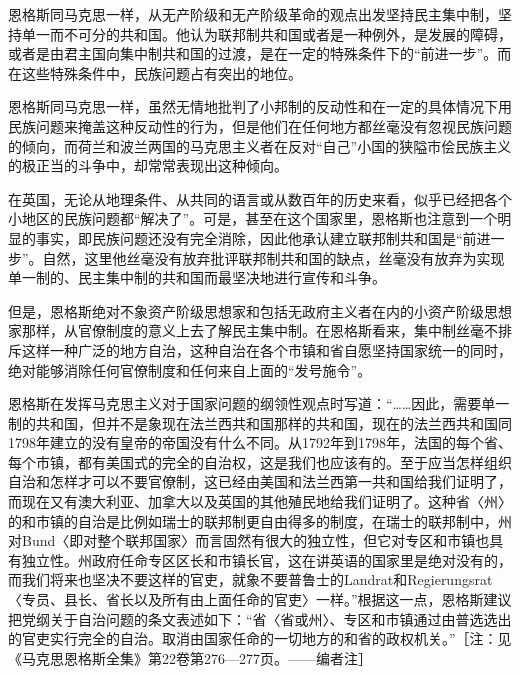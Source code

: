 \documentclass[UTF8, 12pt, a4paper]{ctexrep}
\begin{document}
恩格斯同马克思一样，从无产阶级和无产阶级革命的观点出发坚持民主集中制，坚持单一而不可分的共和国。他认为联邦制共和国或者是一种例外，是发展的障碍，或者是由君主国向集中制共和国的过渡，是在一定的特殊条件下的“前进一步”。而在这些特殊条件中，民族问题占有突出的地位。

恩格斯同马克思一样，虽然无情地批判了小邦制的反动性和在一定的具体情况下用民族问题来掩盖这种反动性的行为，但是他们在任何地方都丝毫没有忽视民族问题的倾向，而荷兰和波兰两国的马克思主义者在反对“自己”小国的狭隘市侩民族主义的极正当的斗争中，却常常表现出这种倾向。

在英国，无论从地理条件、从共同的语言或从数百年的历史来看，似乎已经把各个小地区的民族问题都“解决了”。可是，甚至在这个国家里，恩格斯也注意到一个明显的事实，即民族问题还没有完全消除，因此他承认建立联邦制共和国是“前进一步”。自然，这里他丝毫没有放弃批评联邦制共和国的缺点，丝毫没有放弃为实现单一制的、民主集中制的共和国而最坚决地进行宣传和斗争。

但是，恩格斯绝对不象资产阶级思想家和包括无政府主义者在内的小资产阶级思想家那样，从官僚制度的意义上去了解民主集中制。在恩格斯看来，集中制丝毫不排斥这样一种广泛的地方自治，这种自治在各个市镇和省自愿坚持国家统一的同时，绝对能够消除任何官僚制度和任何来自上面的“发号施令”。

恩格斯在发挥马克思主义对于国家问题的纲领性观点时写道：“……因此，需要单一制的共和国，但并不是象现在法兰西共和国那样的共和国，现在的法兰西共和国同1798年建立的没有皇帝的帝国没有什么不同。从1792年到1798年，法国的每个省、每个市镇，都有美国式的完全的自治权，这是我们也应该有的。至于应当怎样组织自治和怎样才可以不要官僚制，这已经由美国和法兰西第一共和国给我们证明了，而现在又有澳大利亚、加拿大以及英国的其他殖民地给我们证明了。这种省〈州〉的和市镇的自治是比例如瑞士的联邦制更自由得多的制度，在瑞士的联邦制中，州对Bund〈即对整个联邦国家〉而言固然有很大的独立性，但它对专区和市镇也具有独立性。州政府任命专区区长和市镇长官，这在讲英语的国家里是绝对没有的，而我们将来也坚决不要这样的官吏，就象不要普鲁士的Landrat和Regierungsrat〈专员、县长、省长以及所有由上面任命的官吏〉一样。”根据这一点，恩格斯建议把党纲关于自治问题的条文表述如下：“省〈省或州〉、专区和市镇通过由普选选出的官吏实行完全的自治。取消由国家任命的一切地方的和省的政权机关。”［注：见《马克思恩格斯全集》第22卷第276—277页。——编者注］
\end{document}
